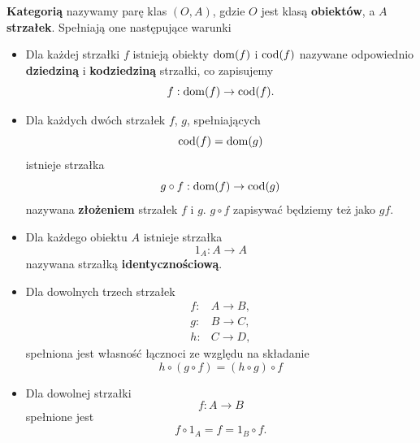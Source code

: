 \begin{definition}
	\textbf{Kategorią} nazywamy parę klas $(O, A)$,
	gdzie $O$ jest klasą \textbf{obiektów}, a $A$ \textbf{strzałek}.
	Spełniają one następujące warunki
	\begin{itemize}
		\item Dla każdej strzałki $f$ istnieją obiekty $\operatorname{dom}(f)$ i $\operatorname{cod}(f)$
		      nazywane odpowiednio \textbf{dziedziną} i \textbf{kodziedziną} strzałki,
		      co zapisujemy
		      \begin{equation}
			      f: \operatorname{dom}(f) \to \operatorname{cod}(f).
		      \end{equation}
		\item Dla każdych dwóch strzałek $f$, $g$, spełniających
		      \begin{equation}
			      \operatorname{cod}(f) = \operatorname{dom}(g)
		      \end{equation}
		      istnieje strzałka
		      \begin{equation}
			      g \circ f: \operatorname{dom}(f) \to \operatorname{cod}(g)
		      \end{equation}
		      nazywana \textbf{złożeniem} strzałek $f$ i $g$.
		      $g \circ f$ zapisywać będziemy też jako $gf$.
		\item Dla każdego obiektu $A$ istnieje strzałka
		      \begin{equation}
			      1_A: A \to A
		      \end{equation}
		      nazywana strzałką \textbf{identycznościową}.
		\item Dla dowolnych trzech strzałek
		      \begin{align}
			      f: & A \to B, \\
			      g: & B \to C, \\
			      h: & C \to D,
		      \end{align}
		      spełniona jest własność łącznoci ze względu na składanie
		      \begin{equation}
			      h \circ (g \circ f) = (h \circ g) \circ f
		      \end{equation}
		\item Dla dowolnej strzałki
		      \begin{equation}
			      f: A \to B
		      \end{equation}
		      spełnione jest
		      \begin{equation}
			      f \circ 1_A = f = 1_B \circ f.
		      \end{equation}
	\end{itemize}
\end{definition}

